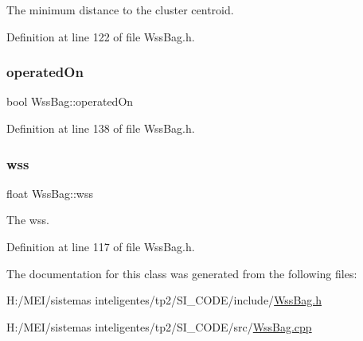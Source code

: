The minimum distance to the cluster centroid. 

Definition at line 122 of file Wss\+Bag.\+h.

\mbox{\label{class_wss_bag_a6092b58db8c3ab366ddc74b3d5ff1ae4}} 
\subsubsection{\texorpdfstring{operated\+On}{operatedOn}}
{\footnotesize\ttfamily bool Wss\+Bag\+::operated\+On\hspace{0.3cm}{\ttfamily [protected]}}



Definition at line 138 of file Wss\+Bag.\+h.

\mbox{\label{class_wss_bag_a95962ba44b5f1fde09bfc53e5c83afaf}} 
\subsubsection{\texorpdfstring{wss}{wss}}
{\footnotesize\ttfamily float Wss\+Bag\+::wss\hspace{0.3cm}{\ttfamily [protected]}}

The wss. 

Definition at line 117 of file Wss\+Bag.\+h.



The documentation for this class was generated from the following files\+:\begin{DoxyCompactItemize}
\item 
H\+:/\+M\+E\+I/sistemas inteligentes/tp2/\+S\+I\+\_\+\+C\+O\+D\+E/include/\hyperlink{_wss_bag_8h}{Wss\+Bag.\+h}\item 
H\+:/\+M\+E\+I/sistemas inteligentes/tp2/\+S\+I\+\_\+\+C\+O\+D\+E/src/\hyperlink{_wss_bag_8cpp}{Wss\+Bag.\+cpp}\end{DoxyCompactItemize}
